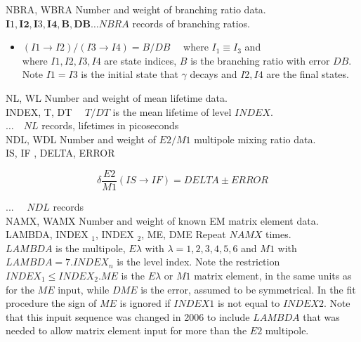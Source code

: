 \documentclass[10pt]{article}
\begin{document}
NBRA, WBRA Number and weight of branching ratio data.\\
$\mathbf{I} 1, \mathbf{I 2}, \mathbf{I} 3, \mathbf{I 4}, \mathbf{B}, \mathbf{D B} \ldots N B R A$ records of branching ratios.

\begin{itemize}
  \item $(I 1 \rightarrow I 2) /(I 3 \rightarrow I 4)=B / D B \quad$ where $I_{1} \equiv I_{3}$ and\\
where $I 1, I 2, I 3, I 4$ are state indices, $B$ is the branching ratio with error $D B$. Note $I 1=I 3$ is the initial state that $\gamma$ decays and $I 2, I 4$ are the final states.
\end{itemize}

NL, WL Number and weight of mean lifetime data.\\
INDEX, T, DT $\quad T / D T$ is the mean lifetime of level $I N D E X$.\\
$\ldots \quad N L$ records, lifetimes in picoseconds\\
NDL, WDL Number and weight of $E 2 / M 1$ multipole mixing ratio data.\\
IS, IF , DELTA, ERROR

$$
\delta \frac{E 2}{M 1}(I S \rightarrow I F)=D E L T A \pm E R R O R
$$

... $\quad N D L$ records\\
NAMX, WAMX Number and weight of known EM matrix element data.\\
LAMBDA, INDEX $_{1}$, INDEX $_{2}$, ME, DME Repeat $N A M X$ times.\\
$L A M B D A$ is the multipole, $E \lambda$ with $\lambda=1,2,3,4,5,6$ and $M 1$ with $L A M B D A=7 . I N D E X_{n}$ is the level index. Note the restriction $I N D E X_{1} \leq I N D E X_{2} . M E$ is the $E \lambda$ or $M 1$ matrix element, in the same units as for the $M E$ input, while $D M E$ is the error, assumed to be symmetrical. In the fit procedure the sign of $M E$ is ignored if $I N D E X 1$ is not equal to $I N D E X 2$. Note that this inpuit sequence was changed in 2006 to include $L A M B D A$ that was needed to allow matrix element input for more than the $E 2$ multipole.
\end{document}
